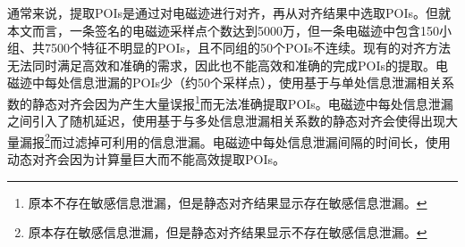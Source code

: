 {{{	
%	
%	
}
	
	通常来说，提取POIs是通过对电磁迹进行对齐，再从对齐结果中选取POIs。但就本文而言，一条签名的电磁迹采样点个数达到5000万，但一条电磁迹中包含150小组、共7500个特征不明显的POIs，且不同组的50个POIs不连续。现有的对齐方法无法同时满足高效和准确的需求，因此也不能高效和准确的完成POIs的提取。电磁迹中每处信息泄漏的POIs少（约50个采样点），使用基于与单处信息泄漏相关系数的静态对齐会因为产生大量误报\footnote{原本不存在敏感信息泄漏，但是静态对齐结果显示存在敏感信息泄漏。}而无法准确提取POIs。电磁迹中每处信息泄漏之间引入了随机延迟，使用基于与多处信息泄漏相关系数的静态对齐会使得出现大量漏报\footnote{原本存在敏感信息泄漏，但是静态对齐结果显示不存在敏感信息泄漏。}而过滤掉可利用的信息泄漏。电磁迹中每处信息泄漏间隔的时间长，使用动态对齐会因为计算量巨大而不能高效提取POIs。
	
}}
